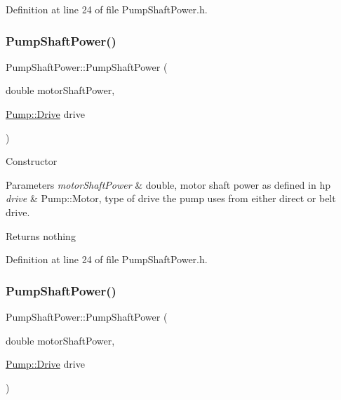 Definition at line 24 of file Pump\+Shaft\+Power.\+h.

\mbox{\label{class_pump_shaft_power_a84d04978ce410d544a4c8d9eb393c92d}} 
\subsubsection{\texorpdfstring{Pump\+Shaft\+Power()}{PumpShaftPower()}\hspace{0.1cm}{\footnotesize\ttfamily [2/3]}}
{\footnotesize\ttfamily Pump\+Shaft\+Power\+::\+Pump\+Shaft\+Power (\begin{DoxyParamCaption}\item[{double}]{motor\+Shaft\+Power,  }\item[{\hyperlink{class_pump_a32bf0ade131a11bb3b3fb374f638e983}{Pump\+::\+Drive}}]{drive }\end{DoxyParamCaption})\hspace{0.3cm}{\ttfamily [inline]}}

Constructor 
\begin{DoxyParams}{Parameters}
{\em motor\+Shaft\+Power} & double, motor shaft power as defined in hp \\
\hline
{\em drive} & Pump\+::\+Motor, type of drive the pump uses from either direct or belt drive. \\
\hline
\end{DoxyParams}
\begin{DoxyReturn}{Returns}
nothing 
\end{DoxyReturn}


Definition at line 24 of file Pump\+Shaft\+Power.\+h.

\mbox{\label{class_pump_shaft_power_a84d04978ce410d544a4c8d9eb393c92d}} 
\subsubsection{\texorpdfstring{Pump\+Shaft\+Power()}{PumpShaftPower()}\hspace{0.1cm}{\footnotesize\ttfamily [3/3]}}
{\footnotesize\ttfamily Pump\+Shaft\+Power\+::\+Pump\+Shaft\+Power (\begin{DoxyParamCaption}\item[{double}]{motor\+Shaft\+Power,  }\item[{\hyperlink{class_pump_a32bf0ade131a11bb3b3fb374f638e983}{Pump\+::\+Drive}}]{drive }\end{DoxyParamCaption})\hspace{0.3cm}{\ttfamily [inline]}}

